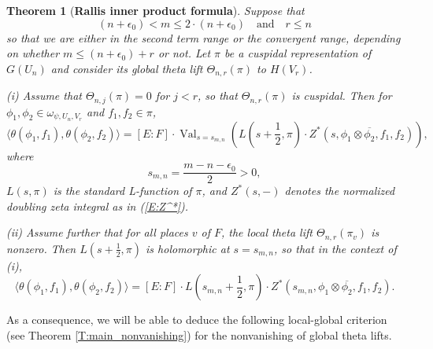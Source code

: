 \documentclass[10pt]{amsart}
\theoremstyle{plain}
\newtheorem{Thm}[equation]{Theorem}
\numberwithin{equation}{section}
\begin{document}
 \begin{Thm}[{\bf Rallis inner product formula}] \label{T:intro2}
 Suppose that 
 \[ (n+\epsilon_0) < m \leq 2 \cdot (n+\epsilon_0) \quad \text{and} \quad  r \leq n \]
 so that we are either in the second term range or the convergent range, depending on whether
 $m \leq (n+\epsilon_0) +r$ or not.  Let
 $\pi$ be a cuspidal representation of $G(U_n)$ and consider its
 global theta lift $\Theta_{n,r}(\pi)$ to $H(V_r)$.   \vskip 5pt
 
 \noindent (i) 
Assume that
 $\Theta_{n,j}(\pi) = 0$ for $j < r$, so that  $\Theta_{n,r}(\pi)$   
 is cuspidal. Then
  for $\phi_1, \phi_2 \in \omega_{\psi, U_n, V_r}$ and $f_1, f_2 \in \pi$, 
 \[  
\langle \theta(\phi_1, f_1) , \theta(\phi_2, f_2) \rangle  
 =  [E:F] \cdot  {\operatorname{Val}}_{s=s_{m,n}}\left( L(s + \frac{1}{2}, \pi)  \cdot Z^*(s,
 \phi_1 \otimes \overline{\phi_2}, f_1, f_2)\right),
 \]
where 
 \[  
s_{m,n} = \frac{m - n-\epsilon_0}{2}  > 0 ,
\]
$L(s,\pi)$ is the standard L-function of $\pi$, and $Z^*(s, -)$ denotes
the normalized doubling zeta integral as in (\ref{E:Z^*}).  
\vskip 5pt

\noindent (ii) Assume further that for all places $v$ of $F$, the local theta lift $\Theta_{n,r}(\pi_v)$ is nonzero. Then $L(s+ \frac{1}{2},\pi)$ is holomorphic at $s = s_{m,n}$, so that in the context of (i),
 \[  
\langle \theta(\phi_1, f_1) , \theta(\phi_2, f_2) \rangle  
 =  [E:F]  \cdot L(s_{m,n} + \frac{1}{2}, \pi)  \cdot Z^*(s_{m,n},
 \phi_1 \otimes \overline{\phi_2}, f_1, f_2).
 \]

\end{Thm}
\vskip 10pt

As  a consequence, we will be able to deduce the following local-global
criterion (see Theorem \ref{T:main_nonvanishing}) for the nonvanishing
of global theta lifts.

 \vskip 5pt
 
\end{document}
